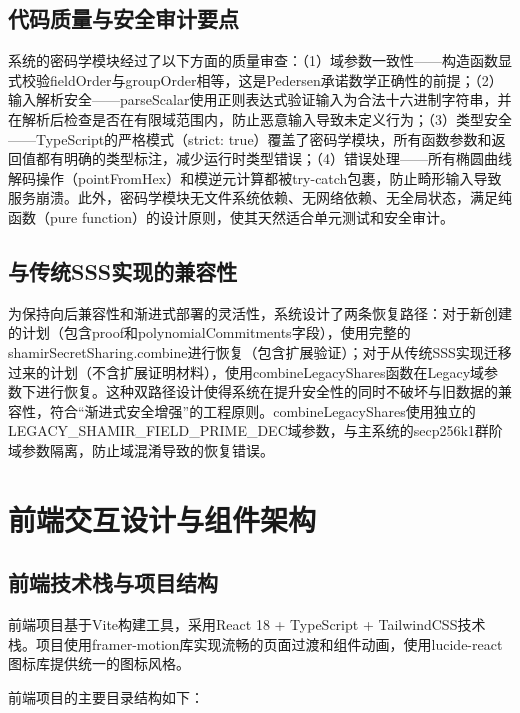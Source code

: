 \documentclass[UTF8,a4paper,zihao=-4,openany]{ctexrep}
\begin{document}
\subsection{代码质量与安全审计要点}

系统的密码学模块经过了以下方面的质量审查：（1）域参数一致性——构造函数显式校验fieldOrder与groupOrder相等，这是Pedersen承诺数学正确性的前提；（2）输入解析安全——parseScalar使用正则表达式验证输入为合法十六进制字符串，并在解析后检查是否在有限域范围内，防止恶意输入导致未定义行为；（3）类型安全——TypeScript的严格模式（strict: true）覆盖了密码学模块，所有函数参数和返回值都有明确的类型标注，减少运行时类型错误；（4）错误处理——所有椭圆曲线解码操作（pointFromHex）和模逆元计算都被try-catch包裹，防止畸形输入导致服务崩溃。此外，密码学模块无文件系统依赖、无网络依赖、无全局状态，满足纯函数（pure function）的设计原则，使其天然适合单元测试和安全审计。

\subsection{与传统SSS实现的兼容性}

为保持向后兼容性和渐进式部署的灵活性，系统设计了两条恢复路径：对于新创建的计划（包含proof和polynomialCommitments字段），使用完整的shamirSecretSharing.combine进行恢复（包含扩展验证）；对于从传统SSS实现迁移过来的计划（不含扩展证明材料），使用combineLegacyShares函数在Legacy域参数下进行恢复。这种双路径设计使得系统在提升安全性的同时不破坏与旧数据的兼容性，符合“渐进式安全增强”的工程原则。combineLegacyShares使用独立的LEGACY\_SHAMIR\_FIELD\_PRIME\_DEC域参数，与主系统的secp256k1群阶域参数隔离，防止域混淆导致的恢复错误。

\section{前端交互设计与组件架构}

\subsection{前端技术栈与项目结构}

前端项目基于Vite构建工具，采用React 18 + TypeScript + TailwindCSS技术栈。项目使用framer-motion库实现流畅的页面过渡和组件动画，使用lucide-react图标库提供统一的图标风格。

前端项目的主要目录结构如下：
\end{document}
